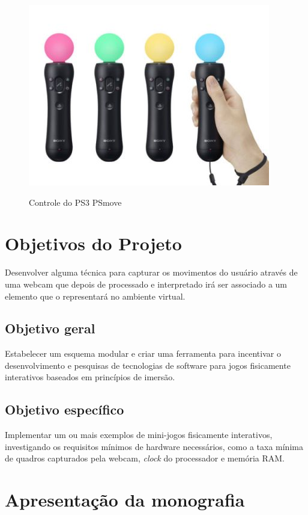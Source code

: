 \begin{figure}[h]
    \center
    \includegraphics[scale=0.45]{imagens/psmove.jpg}
    \label{psmove}
    \caption{Controle do PS3 PSmove}
\end{figure}

\section{Objetivos do Projeto}

Desenvolver alguma técnica para capturar os movimentos do usuário através de uma webcam que depois de processado e interpretado irá ser associado a um elemento
que o representará no ambiente virtual.

\subsection{Objetivo geral}

Estabelecer um esquema modular e criar uma ferramenta para incentivar o desenvolvimento e pesquisas de tecnologias de software para jogos fisicamente interativos
baseados em princípios de imersão.

\subsection{Objetivo específico}

Implementar um ou mais exemplos de mini-jogos fisicamente interativos, investigando os requisitos mínimos de hardware necessários, como a taxa mínima de quadros
capturados pela webcam, \textit{clock} do processador e memória RAM.

\section {Apresentação da monografia}

